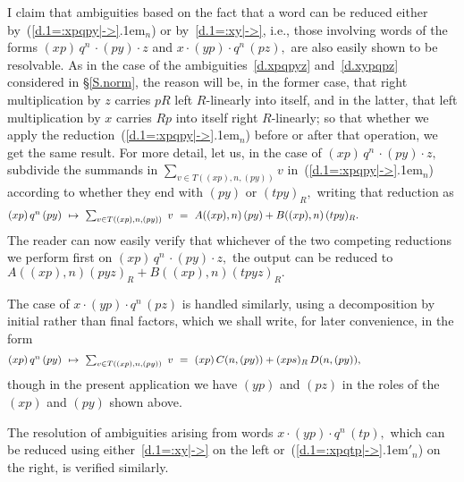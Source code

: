 \documentclass{amsart}
\begin{document}
I claim that ambiguities based on the fact that a word can be
reduced either by~({{\setlength{\mathsurround}{0em}\ref{d.1=:xpqpy|->}\kern.1em$_{{n}}$}}) or by~\eqref{d.1=:xy|->}, i.e., those
involving words of the forms $(xp)\,q^n\,\cdot (py)\cdot z$ and
$x\cdot (yp)\cdot q^n\,(pz),$ are also easily shown to be resolvable.
As in the case of the ambiguities~\eqref{d.xpqpyz}
and~\eqref{d.xypqpz} considered in \S\ref{S.norm}, the
reason will be, in the former case, that right multiplication
by $z$ carries $pR$ left $\!R\!$-linearly into itself, and in the
latter, that left multiplication by $x$ carries $Rp$ into itself
right $\!R\!$-linearly;
so that whether we apply the reduction~({{\setlength{\mathsurround}{0em}\ref{d.1=:xpqpy|->}\kern.1em$_{{n}}$}}) before
or after that operation, we get the same result.
For more detail, let us, in the case of $(xp)\,q^n\,\cdot (py)\cdot z,$
subdivide the summands in $\sum_{v\in T((xp),n,(py))} v$ in~({{\setlength{\mathsurround}{0em}\ref{d.1=:xpqpy|->}\kern.1em$_{{n}}$}})
according to whether they end with $(py)$ or $(tpy)_R,$ writing
that reduction as
\begin{equation}\begin{minipage}[c]{35pc}\label{d.A,B}
$(xp)\,q^n\,(py)\ \mapsto
\ \sum_{v\in T((xp),n,(py))}\ v\ =
\ A((xp),n)\,(py) + B((xp),n)\,(tpy)_R.$
\end{minipage}\end{equation}
The reader can now easily verify that whichever of the
two competing reductions we perform first on
$(xp)\,q^n\,\cdot (py)\cdot z,$
the output can be reduced to $A((xp),n)(pyz)_R + B((xp),n)(tpyz)_R.$

The case of $x\cdot (yp)\cdot q^n\,(pz)$ is handled similarly, using
a decomposition by initial rather than final factors, which we
shall write, for later convenience, in the form
\begin{equation}\begin{minipage}[c]{35pc}\label{d.C,D}
$(xp)\,q^n\,(py)\ \mapsto\ \sum_{v\in T((xp),n,(py))}\ v\ =
\ (xp)\,C(n,(py)) + (xps)_R\,D(n,(py)),$
\end{minipage}\end{equation}
though in the present application we have $(yp)$ and $(pz)$ in the
roles of the $(xp)$ and $(py)$ shown above.

The resolution of
ambiguities arising from words $x\cdot (yp)\cdot q^n\,(tp),$ which
can be reduced using either~\eqref{d.1=:xy|->} on the
left or~({{\setlength{\mathsurround}{0em}\ref{d.1=:xpqtp|->}\kern.1em$'_{{n}}$}}) on the right, is verified similarly.
\end{document}
